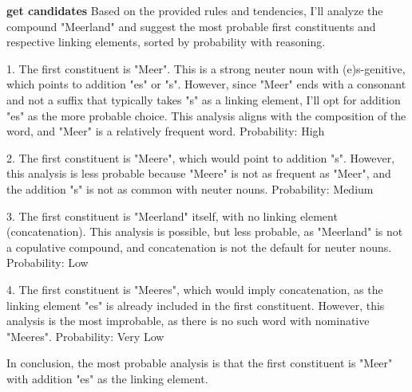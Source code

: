 \documentclass[11pt]{article}
\begin{document}
\begin{center}
    \begin{tcolorbox}[colback=gray!10, colframe=black, width=\linewidth, left=1mm, right=1mm, title=Candidates for \texttt{meer\_land} from \textit{Llama-instruct\textsubscript{+cand}}]
        
        \begin{aimessage}{\textbf{get candidates}}
            Based on the provided rules and tendencies, I'll analyze the compound "Meerland" and suggest the most probable first constituents and respective linking elements, sorted by probability with reasoning.
            
            1. The first constituent is "Meer". This is a strong neuter noun with (e)s-genitive, which points to addition "es" or "s". However, since "Meer" ends with a consonant and not a suffix that typically takes "s" as a linking element, I'll opt for addition "es" as the more probable choice. This analysis aligns with the composition of the word, and "Meer" is a relatively frequent word.
            Probability: High
            
            2. The first constituent is "Meere", which would point to addition "s". However, this analysis is less probable because "Meere" is not as frequent as "Meer", and the addition "s" is not as common with neuter nouns.
            Probability: Medium
            
            3. The first constituent is "Meerland" itself, with no linking element (concatenation). This analysis is possible, but less probable, as "Meerland" is not a copulative compound, and concatenation is not the default for neuter nouns.
            Probability: Low
            
            4. The first constituent is "Meeres", which would imply concatenation, as the linking element "es" is already included in the first constituent. However, this analysis is the most improbable, as there is no such word with nominative "Meeres".
            Probability: Very Low
            
            In conclusion, the most probable analysis is that the first constituent is "Meer" with addition "es" as the linking element.
        \end{aimessage}        
        
    \end{tcolorbox}
\end{center}
\label{chat:meerland_cand}
\end{document}
